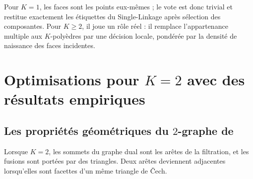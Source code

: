 Pour $K=1$, les faces sont les points eux-mêmes ; le vote est donc trivial et restitue exactement les étiquettes du Single-Linkage après sélection des composantes. Pour $K\ge2$, il joue un rôle réel : il remplace l'appartenance multiple aux $K$-polyèdres par une décision locale, pondérée par la densité de naissance des faces incidentes.

\section{Optimisations pour $K=2$ avec des résultats empiriques}
\label{sec:chapV_k2_empirique}

\subsection{Les propriétés géométriques du $2$-graphe de }
\label{subsec:chapV_k2_algorithme}

Lorsque $K=2$, les sommets du graphe dual sont les arêtes de la filtration, et les fusions sont portées par des triangles. Deux arêtes deviennent adjacentes lorsqu'elles sont facettes d'un même triangle de \v Cech. %

